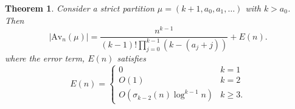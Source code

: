 \documentclass{article}
\theoremstyle{plain}
\newtheorem{theorem}{Theorem}[section]
\theoremstyle{definition}
\newcommand{\Av}{\text{Av}}
\begin{document}
\begin{theorem} \label{thm:nonotch}
Consider a strict partition $\mu=(k+1,a_0,a_1,\ldots)$ with $k>a_0$.  Then \begin{equation}
    |\Av_n(\mu)| = \frac{n^{k-1}}{(k-1)!\prod_{j=0}^{k-1}\left(k-(a_j+j)\right)}+E(n). \label{eq:nonotch}
\end{equation}
where the error term, $E(n)$ satisfies
\begin{equation}
    E(n) = \begin{cases}
    0 & k=1 \\
    O(1) & k=2 \\
    O(\sigma_{k-2}(n)\log^{k-1} n) & k\geq 3.
    \end{cases} \label{eq:errorterms}
\end{equation}

\end{theorem}
\end{document}
